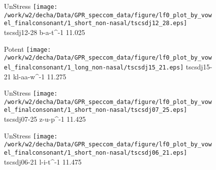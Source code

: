 \documentclass{article}
\begin{document}
\begin{figure}[t]
\begin{minipage}[b]{.24\textwidth}
UnStress
\centering
\texttt{[image: /work/w2/decha/Data/GPR\_speccom\_data/figure/lf0\_plot\_by\_vowel\_finalconsonant/1\_short\_non-nasal/tscsdj12\_28.eps]}
tscsdj12-28 b-a-t\textasciicircum-1 11.025
\end{minipage}
\begin{minipage}[b]{.24\textwidth}
\colorbox{Apricot}{Potent}
\centering
\texttt{[image: /work/w2/decha/Data/GPR\_speccom\_data/figure/lf0\_plot\_by\_vowel\_finalconsonant/1\_long\_non-nasal/tscsdj15\_21.eps]}
tscsdj15-21 kl-aa-w\textasciicircum-1 11.275
\end{minipage}
\begin{minipage}[b]{.24\textwidth}
UnStress
\centering
\texttt{[image: /work/w2/decha/Data/GPR\_speccom\_data/figure/lf0\_plot\_by\_vowel\_finalconsonant/1\_short\_non-nasal/tscsdj07\_25.eps]}
tscsdj07-25 z-u-p\textasciicircum-1 11.425
\end{minipage}
\begin{minipage}[b]{.24\textwidth}
UnStress
\centering
\texttt{[image: /work/w2/decha/Data/GPR\_speccom\_data/figure/lf0\_plot\_by\_vowel\_finalconsonant/1\_short\_non-nasal/tscsdj06\_21.eps]}
tscsdj06-21 l-i-t\textasciicircum-1 11.475
\end{minipage}
\end{figure}
\end{document}
